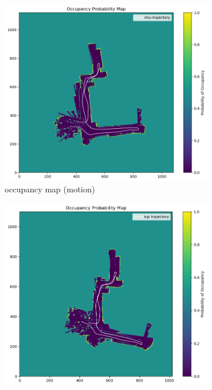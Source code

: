 \documentclass[conference]{IEEEtran}
\begin{document}
\begin{figure}[htbp]
    \begin{subfigure}{0.24\textwidth}
        \includegraphics[width=\linewidth]{../img/omap_20_imu.png}
        \caption{occupancy map (motion)}
        \label{fig:omap_20_imu}
    \end{subfigure}
    \hfill
    \begin{subfigure}{0.24\textwidth}
        \includegraphics[width=\linewidth]{../img/omap_20_icp.png}

\end{subfigure}
\end{figure}
\end{document}
